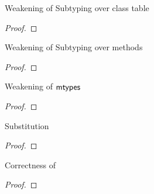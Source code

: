 \documentclass[acmlarge, anonymous, authordraft, review]{acmart} %
\begin{document}
\begin{lemma}{Weakening of Subtyping over class table}{}
  \begin{conds}
    \cond{$\StrSub\M{\K}\t\tp$}
  \end{conds}

  \then\axiom{$\StrSub\M{\K~\Kp}\t\tp$}

  \begin{proof} 
  \end{proof}
\end{lemma}

\begin{lemma}{Weakening of Subtyping over methods}{}
  \begin{conds}
    \cond{$\StrSub\M{\K}\t\tp$}
  \end{conds}

  \then{}

  \begin{proof} 
  \end{proof}
\end{lemma}

\begin{lemma}{Weakening of ${\sf{mtypes}}$}{}
  \begin{conds}
    \cond{$\Mtype\m{\HT\x\t}\tp \in \classoff{\C}{\K}$}
  \end{conds}

  \then{}

  \begin{proof} \innat
  \end{proof}
\end{lemma}

\begin{lemma}{Substitution}{}
  \begin{conds}
    \cond{$\EnvType{\b{\HT\x\tp}}\s\K\e\t$}    
    \cond{$\b{\EnvType\cdot\s\K\a\tp}$}
  \end{conds}

  \then\axiom{$\EnvType\cdot\s\K{[\a/\x]\e}\t$}

  \begin{proof} 
  \end{proof}
\end{lemma}

\begin{lemma}{Correctness of \classoff{\C}{\K}}{}
  \begin{conds}
    \cond{$\Mtype\m{\t}\tp \in \classoff{\C}{\K}$}    
    \cond{$\EnvType\cdot\s\K\a\C$}
    \cond{$\EnvType\cdot\s\K\ap\t$}
    \cond{$\EnvType\cdot\s\K\epp\tp$}
  \end{conds}

  \then\axiom{$\Reduce \K{\KCall\a\m{\ap}{\t}{\tp}}\s \K\epp\s$}

  \begin{proof} \innat
  \end{proof}
\end{lemma}
\end{document}
